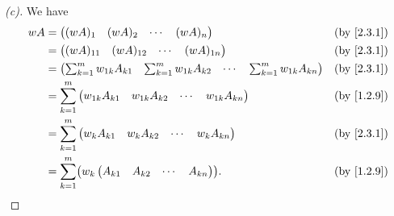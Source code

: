 \begin{proof}[(c)]
  We have
  \begin{align*}
    wA & = \begin{pmatrix}
             (wA)_1 & (wA)_2 & \cdots & (wA)_n
           \end{pmatrix}                                                                         &  & \text{(by \cref{2.3.1})}                    \\
       & = \begin{pmatrix}
             (wA)_{1 1} & (wA)_{1 2} & \cdots & (wA)_{1 n}
           \end{pmatrix}                                                             &  & \text{(by \cref{2.3.1})}                                \\
       & = \begin{pmatrix}
             \sum_{k = 1}^m w_{1 k} A_{k 1} & \sum_{k = 1}^m w_{1 k} A_{k 2} & \cdots & \sum_{k = 1}^m w_{1 k} A_{k n}
           \end{pmatrix} &  & \text{(by \cref{2.3.1})}                              \\
       & = \sum_{k = 1}^m \begin{pmatrix}
                            w_{1 k} A_{k 1} & w_{1 k} A_{k 2} & \cdots & w_{1 k} A_{k n}
                          \end{pmatrix}                                              &  & \text{(by \cref{1.2.9})}                                \\
       & = \sum_{k = 1}^m \begin{pmatrix}
                            w_k A_{k 1} & w_k A_{k 2} & \cdots & w_k A_{k n}
                          \end{pmatrix}                                                          &  & \text{(by \cref{2.3.1})}                    \\
       & = \sum_{k = 1}^m \pa{w_k \begin{pmatrix}
                                      A_{k 1} & A_{k 2} & \cdots & A_{k n}
                                    \end{pmatrix}}.                                                                   &  & \text{(by \cref{1.2.9})} \\
  \end{align*}
\end{proof}

